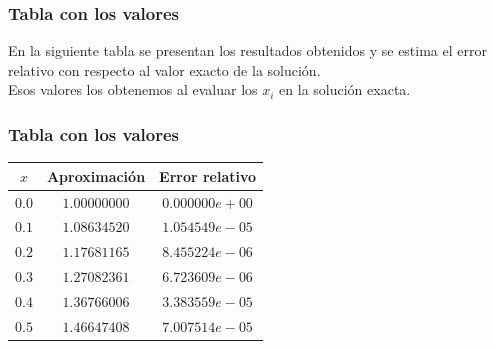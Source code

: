 \documentclass[12pt]{beamer}
\begin{document}
\begin{frame}
\frametitle{Tabla con los valores}
En la siguiente tabla se presentan los resultados obtenidos y se estima el error relativo con respecto al valor exacto de la solución.
\\
\bigskip
\pause
Esos valores los obtenemos al evaluar los $x_{i}$ en la solución exacta.
\end{frame}
\begin{frame}
\frametitle{Tabla con los valores}
\begin{table}
\centering
\renewcommand*{\arraystretch}{0.9}
\begin{tabular}{ c c c}
$x$ & Aproximación & Error relativo \\ \hline
$0.0$ & $1.00000000$ & $0.000000e+00$ \\ \hline
$0.1$ & $1.08634520$ & $1.054549e-05$ \\ \hline
$0.2$ & $1.17681165$ & $8.455224e-06$ \\ \hline
$0.3$ & $1.27082361$ & $6.723609e-06$ \\ \hline
$0.4$ & $1.36766006$ & $3.383559e-05$ \\ \hline
$0.5$ & $1.46647408$ & $7.007514e-05$ \\ \hline
\end{tabular}
\end{table}
\end{frame}
\end{document}
